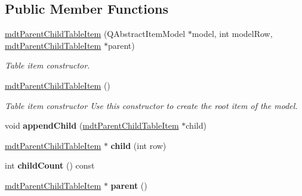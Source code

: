 \subsection*{Public Member Functions}
\begin{DoxyCompactItemize}
\item 
\hyperlink{classmdt_parent_child_table_item_afd38823879e25db1dca8099fb138042c}{mdtParentChildTableItem} (QAbstractItemModel $\ast$model, int modelRow, \hyperlink{classmdt_parent_child_table_item}{mdtParentChildTableItem} $\ast$parent)
\begin{DoxyCompactList}\small\item\em Table item constructor. \end{DoxyCompactList}\item 
\hypertarget{classmdt_parent_child_table_item_ad1a5c00ca1d0367d631548fa5732d41c}{
\hyperlink{classmdt_parent_child_table_item_ad1a5c00ca1d0367d631548fa5732d41c}{mdtParentChildTableItem} ()}
\label{classmdt_parent_child_table_item_ad1a5c00ca1d0367d631548fa5732d41c}

\begin{DoxyCompactList}\small\item\em Table item constructor Use this constructor to create the root item of the model. \end{DoxyCompactList}\item 
\hypertarget{classmdt_parent_child_table_item_a182fff209f0a7c9319cbcf72908df69f}{
void {\bfseries appendChild} (\hyperlink{classmdt_parent_child_table_item}{mdtParentChildTableItem} $\ast$child)}
\label{classmdt_parent_child_table_item_a182fff209f0a7c9319cbcf72908df69f}

\item 
\hypertarget{classmdt_parent_child_table_item_ab6c36c72d8eb49fac2035d7e2b9474a3}{
\hyperlink{classmdt_parent_child_table_item}{mdtParentChildTableItem} $\ast$ {\bfseries child} (int row)}
\label{classmdt_parent_child_table_item_ab6c36c72d8eb49fac2035d7e2b9474a3}

\item 
\hypertarget{classmdt_parent_child_table_item_ac2168fc5f960d506f090b7aafcb4fec2}{
int {\bfseries childCount} () const }
\label{classmdt_parent_child_table_item_ac2168fc5f960d506f090b7aafcb4fec2}

\item 
\hypertarget{classmdt_parent_child_table_item_ac4491aa3959249d1a1a6f1582b975589}{
\hyperlink{classmdt_parent_child_table_item}{mdtParentChildTableItem} $\ast$ {\bfseries parent} ()}
\label{classmdt_parent_child_table_item_ac4491aa3959249d1a1a6f1582b975589}


\end{DoxyCompactItemize}
